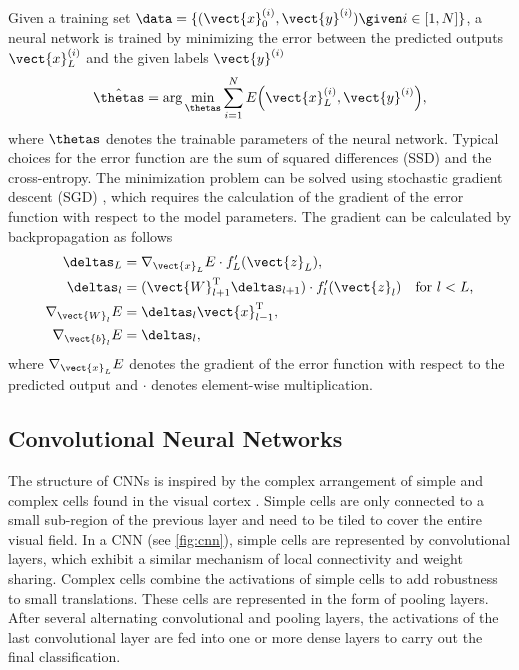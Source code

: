 Given a training set $\data = \{(\vect{x}_0^{(i)}, \vect{y}^{(i)})\given i
\in [1, N] \}$, a neural network is trained by minimizing the error
between the predicted outputs $\vect{x}_L^{(i)}$ and the given labels
$\vect{y}^{(i)}$
\begin{equation}
\hat{\thetas} = \arg\min_{\thetas} \sum_{i = 1}^N E\Big(\vect{x}_L^{(i)},
\vect{y}^{(i)}\Big),
\end{equation}
where $\thetas$ denotes the trainable parameters of the neural network. Typical
choices for the error function are the sum of squared differences (SSD) and the
cross-entropy.
The minimization problem can be solved using stochastic gradient descent (SGD)
\citep{rumelhart1986,polyak1992}, which requires the calculation of the gradient
of the error function with respect to the model parameters. The gradient can be
calculated by backpropagation \citep{werbos1974} as follows
\begin{align}
\deltas_L &= \nabla_{\vect{x}_L}E \cdot f_L'(\vect{z}_L), \\
\deltas_l &= (\vect{W}_{l+1}^\text{T}\deltas_{l+1}) \cdot
f_l'(\vect{z}_l) & \text{for $l < L$,}\\
\nabla_{\vect{W}_l}E &= \deltas_l\vect{x}_{l-1}^\text{T}, \\
\nabla_{\vect{b}_l}E &= \deltas_l,
\end{align}
where $\nabla_{\vect{x}_L}E$ denotes the gradient of the error function with
respect to the predicted output and $\cdot$ denotes element-wise multiplication.

\subsection{Convolutional Neural Networks}

The structure of CNNs is inspired by the complex arrangement of simple and
complex cells found in the visual cortex \citep{hubel1962,hubel1968}. Simple
cells are only connected to a small sub-region of the previous layer and need to
be tiled to cover the entire visual field. In a CNN (see \ref{fig:cnn}),
simple cells are represented by convolutional layers, which exhibit a similar
mechanism of local connectivity and weight sharing. Complex cells combine the
activations of simple cells to add robustness to small translations. These cells
are represented in the form of pooling layers. After several alternating
convolutional and pooling layers, the activations of the last convolutional
layer are fed into one or more dense layers to carry out the final
classification.

